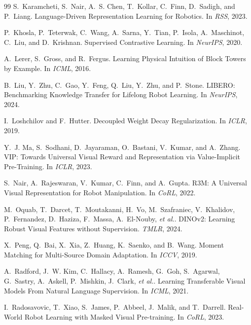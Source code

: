 \documentclass{article}
\newcommand{\etal}{\textit{et al.}}
\begin{document}
\begin{thebibliography}{99}
S.~Karamcheti, S.~Nair, A.~S. Chen, T.~Kollar, C.~Finn, D.~Sadigh, and P.~Liang.
\newblock Language-Driven Representation Learning for Robotics.
\newblock In \emph{RSS}, 2023.

P.~Khosla, P.~Teterwak, C.~Wang, A.~Sarna, Y.~Tian, P.~Isola, A.~Maschinot, C.~Liu, and D.~Krishnan.
\newblock Supervised Contrastive Learning.
\newblock In \emph{NeurIPS}, 2020.

A.~Lerer, S.~Gross, and R.~Fergus.
\newblock Learning Physical Intuition of Block Towers by Example.
\newblock In \emph{ICML}, 2016.

B.~Liu, Y.~Zhu, C.~Gao, Y.~Feng, Q.~Liu, Y.~Zhu, and P.~Stone.
\newblock LIBERO: Benchmarking Knowledge Transfer for Lifelong Robot Learning.
\newblock In \emph{NeurIPS}, 2024.

I.~Loshchilov and F.~Hutter.
\newblock Decoupled Weight Decay Regularization.
\newblock In \emph{ICLR}, 2019.

Y.~J. Ma, S.~Sodhani, D.~Jayaraman, O.~Bastani, V.~Kumar, and A.~Zhang.
\newblock VIP: Towards Universal Visual Reward and Representation via Value-Implicit Pre-Training.
\newblock In \emph{ICLR}, 2023.

S.~Nair, A.~Rajeswaran, V.~Kumar, C.~Finn, and A.~Gupta.
\newblock R3M: A Universal Visual Representation for Robot Manipulation.
\newblock In \emph{CoRL}, 2022.

M.~Oquab, T.~Darcet, T.~Moutakanni, H.~Vo, M.~Szafraniec, V.~Khalidov, P.~Fernandez, D.~Haziza, F.~Massa, A.~El-Nouby, \etal.
\newblock DINOv2: Learning Robust Visual Features without Supervision.
\newblock \emph{TMLR}, 2024.

X.~Peng, Q.~Bai, X.~Xia, Z.~Huang, K.~Saenko, and B.~Wang.
\newblock Moment Matching for Multi-Source Domain Adaptation.
\newblock In \emph{ICCV}, 2019.

A.~Radford, J.~W. Kim, C.~Hallacy, A.~Ramesh, G.~Goh, S.~Agarwal, G.~Sastry, A.~Askell, P.~Mishkin, J.~Clark, \etal.
\newblock Learning Transferable Visual Models From Natural Language Supervision.
\newblock In \emph{ICML}, 2021.

I.~Radosavovic, T.~Xiao, S.~James, P.~Abbeel, J.~Malik, and T.~Darrell.
\newblock Real-World Robot Learning with Masked Visual Pre-training.
\newblock In \emph{CoRL}, 2023.


\end{thebibliography}
\end{document}
